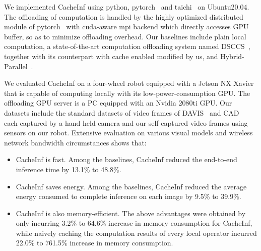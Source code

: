 
We implemented CacheInf using python, pytorch~\cite{paszke2017automatic} and taichi~\cite{taichi} on Ubuntu20.04. 
The offloading of computation is handled by the highly optimized distributed module of pytorch~\cite{torch_distributed} with cuda-aware mpi backend which directly accesses GPU buffer, so as to minimize offloading overhead.
Our baselines include plain local computation, a state-of-the-art computation offloading system named DSCCS~\cite{liang2023dnn}, together with its counterpart with cache enabled modified by us, and Hybrid-Parallel~\cite{sun2024hybridparallel}.

We evaluated CacheInf on a four-wheel robot equipped with a Jetson NX Xavier~\cite{jetsonnx} that is capable of computing locally with its low-power-consumption GPU.
The offloading GPU server is a PC equipped with an Nvidia 2080ti GPU.
Our datasets include the standard datasets of video frames of DAVIS~\cite{Perazzi2016} and CAD~\cite{Choi_VSWS_2009} each captured by a hand held camera and our self captured video frames using sensors on our robot.
Extensive evaluation on various visual models and wireless network bandwidth circumstances shows that:
\begin{itemize}
    \item CacheInf is fast. Among the baselines, CacheInf reduced the end-to-end inference time by 13.1\% to 48.8\%.
    \item CacheInf saves energy. Among the baselines, CacheInf reduced the average energy consumed to complete inference on each image by 9.5\% to 39.9\%.
    \item CacheInf is also memory-efficient. The above advantages were obtained by only incurring 3.2\% to 64.6\% increase in memory consumption for CacheInf, while naively caching the computation results of every local operator incurred 22.0\% to 761.5\% increase in memory consumption.
\end{itemize}

